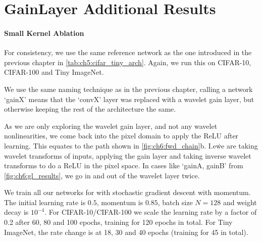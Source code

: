 \chapter{GainLayer Additional Results}\label{app:ch6:more_results}
\subsubsection{Small Kernel Ablation}
For consistency, we use the same reference network as the one introduced in the
previous chapter in \autoref{tab:ch5:cifar_tiny_arch}. Again, we run this on CIFAR-10, 
CIFAR-100 and Tiny ImageNet. 

We use the same naming technique as in the previous chapter, calling a network
`gainX' means that the `convX' layer was replaced with a wavelet gain layer, but
otherwise keeping the rest of the architecture the same. 

As we are only exploring the wavelet gain layer, and not any wavelet
nonlinearities, we come back into the pixel domain to apply the ReLU after
learning. 
This equates to the path shown in \autoref{fig:ch6:fwd_chain}b. 
I.e\. we are taking wavelet transforms of inputs, applying the gain layer and
taking inverse wavelet transforms to do a ReLU in the pixel space. In cases like
`gainA, gainB' from \autoref{fig:ch6:gl_results}, we go in and out of the
wavelet layer twice.

We train all our networks for with stochastic gradient descent with momentum.
The initial learning rate is $0.5$, momentum is $0.85$, batch size $N=128$ and
weight decay is $10^{-4}$. For CIFAR-10/CIFAR-100 we scale the learning rate by
a factor of 0.2 after 60, 80 and 100 epochs, training for 120 epochs in total.
For Tiny ImageNet, the rate change is at 18, 30 and 40 epochs (training for 45 in total).

\begin{figure}[t]
  \centering
  \\
  \label{fig:ch6:gl_results}
\end{figure}

